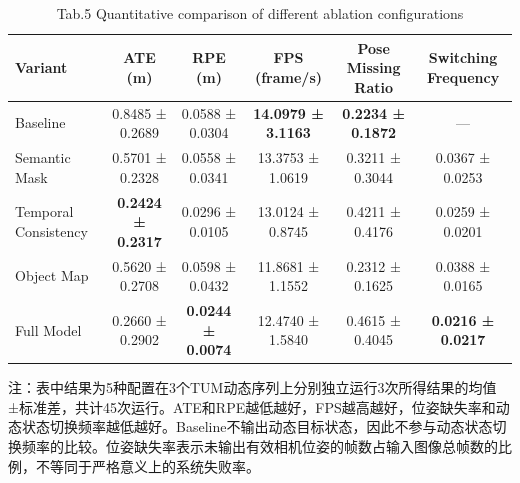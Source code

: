 \begin{table}[htbp]
\centering
\caption{表5 不同消融配置的定量结果比较}
\caption*{Tab.5 Quantitative comparison of different ablation configurations}
\label{tab:ablation_revised}
\begin{tabular}{lccccc}
\toprule
Variant & ATE (m) & RPE (m) & FPS (frame/s) & Pose Missing Ratio & Switching Frequency \\
\midrule
Baseline & 0.8485 ± 0.2689 & 0.0588 ± 0.0304 & \textbf{14.0979 ± 3.1163} & \textbf{0.2234 ± 0.1872} & — \\
Semantic Mask & 0.5701 ± 0.2328 & 0.0558 ± 0.0341 & 13.3753 ± 1.0619 & 0.3211 ± 0.3044 & 0.0367 ± 0.0253 \\
Temporal Consistency & \textbf{0.2424 ± 0.2317} & 0.0296 ± 0.0105 & 13.0124 ± 0.8745 & 0.4211 ± 0.4176 & 0.0259 ± 0.0201 \\
Object Map & 0.5620 ± 0.2708 & 0.0598 ± 0.0432 & 11.8681 ± 1.1552 & 0.2312 ± 0.1625 & 0.0388 ± 0.0165 \\
Full Model & 0.2660 ± 0.2902 & \textbf{0.0244 ± 0.0074} & 12.4740 ± 1.5840 & 0.4615 ± 0.4045 & \textbf{0.0216 ± 0.0217} \\
\bottomrule
\end{tabular}
\vspace{0.5ex}
\begin{minipage}{0.98\linewidth}
\small 注：表中结果为5种配置在3个TUM动态序列上分别独立运行3次所得结果的均值±标准差，共计45次运行。ATE和RPE越低越好，FPS越高越好，位姿缺失率和动态状态切换频率越低越好。Baseline不输出动态目标状态，因此不参与动态状态切换频率的比较。位姿缺失率表示未输出有效相机位姿的帧数占输入图像总帧数的比例，不等同于严格意义上的系统失败率。
\end{minipage}
\end{table}
